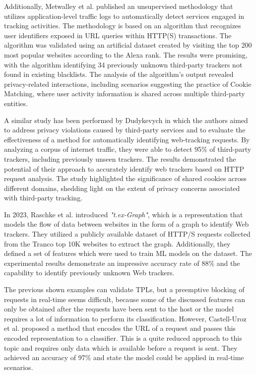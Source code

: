 Additionally, Metwalley et al. \cite{metwalley2015unsupervised} published an unsupervised methodology that utilizes application-level traffic logs to automatically
detect services engaged in tracking activities. The methodology is based on an algorithm that recognizes user identifiers exposed
in URL queries within HTTP(S) transactions. The algorithm was validated using an artificial dataset created by visiting the top
200 most popular websites according to the Alexa rank. The results were promising, with the algorithm identifying 34 previously
unknown third-party trackers not found in existing blacklists. The analysis of the algorithm's output revealed privacy-related
interactions, including scenarios suggesting the practice of Cookie Matching, where user activity information is shared across
multiple third-party entities.

A similar study has been performed by Dudykevych \cite{dudykevych2016detecting} in which the authors aimed to address privacy violations caused by third-party services and to evaluate the effectiveness
of a method for automatically identifying web-tracking requests. By analyzing a corpus of internet traffic, they were able
to detect 95\% of third-party trackers, including previously unseen trackers. The results demonstrated the potential of
their approach to accurately identify web trackers based on HTTP request analysis. The study highlighted the significance
of shared cookies across different domains, shedding light on the extent of privacy concerns associated with third-party tracking.

In 2023, Raschke et al. \cite{raschke2023} introduced \emph{"t.ex-Graph"}, which is a representation that models the flow of data
between websites in the form of a graph to identify Web trackers. They utilized a publicly available dataset
of HTTP/S requests collected from the Tranco \cite{pochat2018tranco} top 10K websites to extract the graph. Additionally, they defined a set of features
which were used to train ML models on the dataset. The experimental results demonstrate an impressive accuracy rate of 88\% and the capability to identify previously unknown Web trackers.

The previous shown examples can validate TPLs, but a preemptive blocking of requests in real-time seems difficult, because some 
of the discussed features can only be obtained after the requests have been sent to the host or the model requires a lot of information
to perform its classification. However, Castell-Uroz et al. \cite{castell2020url} proposed a method that encodes the URL of a request and passes this
encoded representation to a classifier. This is a quite reduced approach to this topic and requires only data which is available before a request
is sent. They achieved an accuracy of 97\% and state the model could be applied in real-time scenarios.

